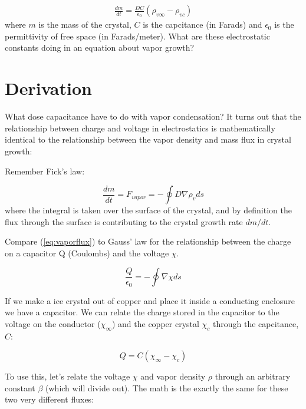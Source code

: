 \documentclass[12pt]{article}
\begin{document}
\begin{gather}
  \label{finalC}
  \frac{dm}{dt} = \frac{ D C}{\epsilon_0}  \left ( \rho_{v \infty} - \rho_{vc}  \right )
\end{gather}
where $m$ is the mass of the crystal, $C$ is the capcitance (in Farads) and 
$\epsilon_0$ is the permittivity of free space (in Farads/meter).
What are these electrostatic constants doing in an equation about vapor growth?


\section{Derivation}
\label{sec:mass-continuity}

What dose capacitance have to do with vapor condensation? It turns out that the relationship
between charge and voltage in electrostatics is  mathematically identical to the relationship
between the vapor density and mass flux in crystal growth:

Remember Fick's law:


\begin{equation}
  \label{eq:vaporflux}
\frac{ dm}{dt} = F_{vapor} = - \oint D \nabla   \rho_v ds
\end{equation}
where the integral is taken over the surface of the crystal, and by definition
the flux through the surface is contributing to the crystal growth
rate $dm/dt$.


Compare (\ref{eq:vaporflux}) to Gauss' law for the relationship
between the charge on a capacitor Q (Coulombs) and
the voltage $\chi$.

\begin{equation}
  \label{eq:coloumb}
\frac{ Q}{\epsilon_0}  = - \oint  \nabla   \chi ds
\end{equation}

If we make a ice crystal out of copper and place it inside
a conducting enclosure we have a capacitor.  We can relate
the charge stored in the capacitor to the voltage on the
conductor ($\chi_\infty$) and the copper crystal $\chi_c$
through the capcitance, $C$:

\begin{equation}
  \label{eq:cap}
  Q = C ( \chi_\infty - \chi_c )
\end{equation}

To use this, let's relate the voltage $\chi$ and vapor density $\rho$ through
an arbitrary constant $\beta$ (which will divide out).  The math is the exactly the same
for these two very different fluxes:
\end{document}
